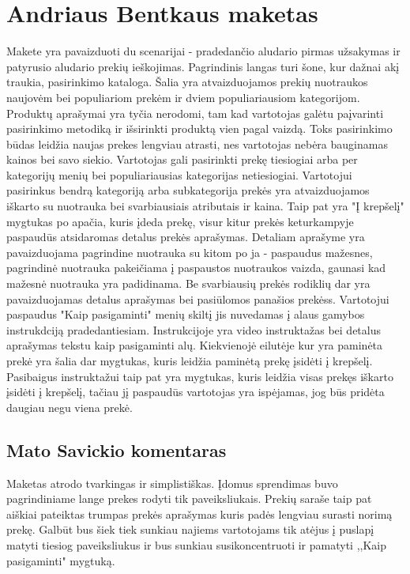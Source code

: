 \documentclass[oneside]{VUMIFPSkursinis}
\begin{document}
\section{Andriaus Bentkaus maketas}
	Makete yra pavaizduoti du scenarijai - pradedančio aludario pirmas užsakymas ir patyrusio aludario prekių ieškojimas.
	Pagrindinis langas turi šone, kur dažnai akį traukia, pasirinkimo kataloga.
	Šalia yra atvaizduojamos prekių nuotraukos naujovėm bei populiariom prekėm ir dviem populiariausiom kategorijom.
	Produktų aprašymai yra tyčia nerodomi, tam kad vartotojas galėtu paįvarinti pasirinkimo metodiką ir išsirinkti produktą vien pagal vaizdą.
	Toks pasirinkimo būdas leidžia naujas prekes lengviau atrasti, nes vartotojas nebėra bauginamas kainos bei savo siekio. \newline
	Vartotojas gali pasirinkti prekę tiesiogiai arba per kategorijų menių bei populiariausias kategorijas netiesiogiai.
	Vartotojui pasirinkus bendrą kategoriją arba subkategorija prekės yra atvaizduojamos iškarto su nuotrauka bei svarbiausiais atributais ir kaina.
	Taip pat yra "Į krepšelį" mygtukas po apačia, kuris įdeda prekę, visur kitur prekės keturkampyje paspaudūs atsidaromas detalus prekės aprašymas. \newline
	Detaliam aprašyme yra pavaizduojama pagrindine nuotrauka su kitom po ja - paspaudus mažesnes, pagrindinė nuotrauka pakeičiama į paspaustos nuotraukos vaizda, gaunasi kad mažesnė nuotrauka yra padidinama.
	Be svarbiausių prekės rodiklių dar yra pavaizduojamas detalus aprašymas bei pasiūlomos panašios prekėss. \newline
	Vartotojui paspaudus "Kaip pasigaminti" menių skiltį jis nuvedamas į alaus gamybos instrukdciją pradedantiesiam.
	Instrukcijoje yra video instruktažas bei detalus aprašymas tekstu kaip pasigaminti alų.
	Kiekvienojė eilutėje kur yra paminėta prekė yra šalia dar mygtukas, kuris leidžia paminėtą prekę įsidėti į krepšelį.
	Pasibaigus instruktažui taip pat yra mygtukas, kuris leidžia visas prekęs iškarto įsidėti į krepšelį, tačiau jį paspaudūs vartotojas yra ispėjamas, jog būs pridėta daugiau negu viena prekė.

	\subsection{Mato Savickio komentaras}
Maketas atrodo tvarkingas ir simplistiškas. Įdomus sprendimas buvo pagrindiniame lange prekes rodyti tik paveiksliukais. Prekių saraše taip pat aiškiai pateiktas trumpas prekės aprašymas kuris padės lengviau surasti norimą prekę. Galbūt bus šiek tiek sunkiau najiems vartotojams tik atėjus į puslapį matyti tiesiog paveiksliukus ir bus sunkiau susikoncentruoti ir pamatyti ,,Kaip pasigaminti" mygtuką.
\end{document}
